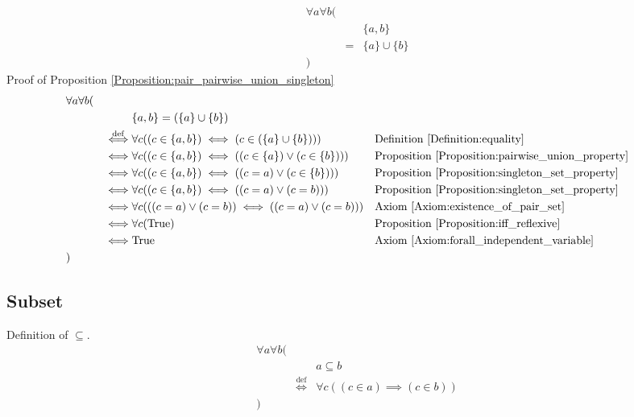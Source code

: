 \begin{prop}
\label{Proposition:pair_pairwise_union_singleton}
\begin{align*}
& \forall a \forall b ( \\
& & & \{ a , b \} \\
& & = & \{ a \} \cup \{ b \} \\
& )
\end{align*}
Proof of Proposition \ref{Proposition:pair_pairwise_union_singleton}
\begin{align*}
& \forall a \forall b ( \\
& & & \{ a , b \} = (\{ a \} \cup \{ b \}) \\
& & \overset{\operatorname{def}}{\iff} & \forall c ((c \in \{ a , b \}) \iff (c \in (\{ a \} \cup \{ b \})))
& & \text{Definition \ref{Definition:equality}} \\
& & \iff & \forall c ((c \in \{ a , b \}) \iff ((c \in \{ a \}) \lor (c \in \{ b \})))
& & \text{Proposition \ref{Proposition:pairwise_union_property}} \\
& & \iff & \forall c ((c \in \{ a , b \}) \iff ((c = a) \lor (c \in \{ b \})))
& & \text{Proposition \ref{Proposition:singleton_set_property}} \\
& & \iff & \forall c ((c \in \{ a , b \}) \iff ((c = a) \lor (c = b)))
& & \text{Proposition \ref{Proposition:singleton_set_property}} \\
& & \iff & \forall c (((c = a) \lor (c = b)) \iff ((c = a) \lor (c = b)))
& & \text{Axiom \ref{Axiom:existence_of_pair_set}} \\
& & \iff & \forall c (\text{True})
& & \text{Proposition \ref{Proposition:iff_reflexive}} \\
& & \iff & \text{True}
& & \text{Axiom \ref{Axiom:forall_independent_variable}} \\
& )
\end{align*}
\end{prop}

\subsection{Subset}
\begin{defn}
\label{Definition:subset}
Definition of $\subseteq$.
\begin{align*}
& \forall a \forall b ( \\
& & & a \subseteq b \\
& & \overset{\operatorname{def}}{\iff} & \forall c ((c \in a) \implies (c \in b)) \\
& )
\end{align*}
\end{defn}

